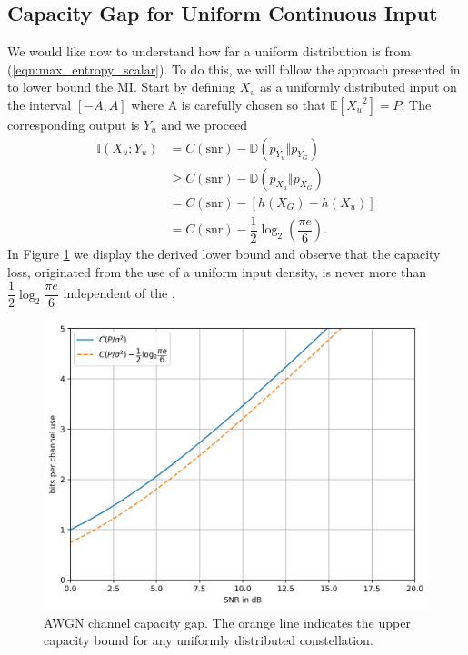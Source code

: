 \subsection{Capacity Gap for Uniform Continuous Input}
\begin{figure}[ht!]
\centering
{}
\end{figure}
We would like now to understand how far a uniform distribution is from (\ref{eqn:max_entropy_scalar}). To do this, we will follow the approach presented in \cite{BoechererCM} to lower bound the MI. Start by defining $X_u$ as a uniformly distributed input on the interval $[-A, A]$ where A is carefully chosen so that $\mathbb{E}[{X_u}^2] = P$. The corresponding output is $Y_u$ and we proceed
\begin{align}
	\mathbb{I}(X_u;Y_u) &= C(\text{snr}) - \mathbb{D}(p_{Y_u} \Vert p_{Y_G})\\
	& \geq C(\text{snr}) - \mathbb{D}(p_{X_u} \Vert p_{X_G})\\
	& = C(\text{snr}) -[h(X_G) - h(X_u)]\\
	& = C(\text{snr}) - \dfrac{1}{2} \log_{2} \left(\dfrac{\pi e}{6}\right).
	\label{eqn:gap}
\end{align}
In Figure \ref{fig:capacity_gap} we display the derived lower bound and observe that the capacity loss, originated from the use of a uniform input density, is never more than $\dfrac{1}{2}\log_2\dfrac{\pi e}{6}$ independent of the .
\begin{figure}
	\includegraphics[width=\textwidth]{figs/capacity_gap.png}
	\caption{AWGN channel capacity gap. The orange line indicates the upper capacity bound for any uniformly distributed constellation.}
    \label{fig:capacity_gap}
\end{figure}
